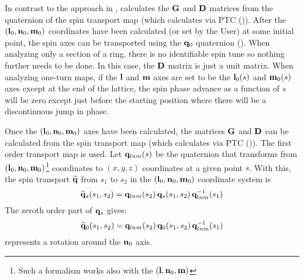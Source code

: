 In contrast to the approach in \cite{b:barber85,b:barber99}, \bmad calculates the ${\bf G}$ and ${\bf D}$
matrices from the quaternion of the spin transport map (which \bmad calculates via PTC
()). After the $({\bf l}_0, {\bf n}_0, {\bf m}_0)$ coordinates have been calculated (or set by
the User) at some initial point, the spin axes can be transported using the ${\bf q}_0$ quaternion
(). When analyzing only a section of a ring, there is no identifiable spin tune so nothing
further needs to be done. In this case, the ${\bf D}$ matrix is just a unit matrix. When analyzing
one-turn maps, if the ${\bf l}$ and ${\bf m}$ axes are set to be the ${\bf l}_0(s)$ and ${\bf m}_0(s)$ axes
except at the end of the lattice, the spin phase advance as a function of $s$ will be zero except
just before the starting position where there will be a discontinuous jump in phase.

Once the $({\bf l}_0, {\bf n}_0, {\bf m}_0)$ axes have been calculated, the matrices ${\bf G}$ and ${\bf D}$ can be
calculated from the spin transport map (which \bmad calculates via PTC ()).  The
first order transport map  is used. Let ${\bf q}_{lnm}(s)$ be the quaternion that transforms
from $({\bf l}_0, {\bf n}_0, {\bf m}_0)$\footnote{ Such a formalism works also with the $({\bf l}, {\bf n}_0,
{\bf m})$} coordinates to $(x, y, z)$ coordinates at a given point $s$. With this, the spin transport
$\widehat{{\bf q}}$ from $s_1$ to $s_2$ in the $({\bf l}_0, {\bf n}_0, {\bf m}_0)$ coordinate system is
\begin{equation}
  \widehat{{\bf q}}_s(s_1, s_2) = {\bf q}_{lnm}(s_2) \, {\bf q}_s(s_1, s_2) \, {\bf q}_{lnm}^{-1}(s_1)
\end{equation}
The zeroth order part of ${\bf q}_s$ gives:
\begin{equation}
  \widehat{{\bf q}}_0(s_1,s_2) = {\bf q}_{lnm}(s_2) \, {\bf q}_0(s_1, s_2) \, {\bf q}_{lnm}^{-1}(s_1) 
\end{equation}
represents a rotation around the ${\bf n}_0$ axis. 

